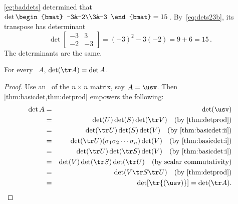 \begin{example} 
\cref{eg:baddets} determined that
\(\det\begin{bmat} -3&-2\\3&-3 \end{bmat}=15\)\,.
By~\eqref{eq:dets23b}, its transpose has determinant
\begin{equation*}
\det\begin{bmatrix} -3&3\\-2&-3 \end{bmatrix}
=(-3)^2-3(-2)=9+6=15\,.
\end{equation*}
The determinants are the same.
\end{example}




\begin{theorem} \label{thm:dettr} 
For every ~\(A\), \(\det(\tr A)=\det A\).
\end{theorem}
\begin{proof} 
Use an \svd\ of the \(n\times n\) matrix, say \(A=\usv\).
Then \cref{thm:basicdet,thm:detprod} empowers the following:
\begin{eqnarray*}
\det A&=&\det(\usv)
\\&=&\det(U)\det(S)\det(\tr V)\quad(\text{by \cref{thm:detprod}})
\\&=&\det(\tr U)\det(S)\det(V)\quad(\text{by \cref{thm:basicdet:ii}})
\\&=&\det(\tr U)(\sigma_1\sigma_2\cdots\sigma_n)\det(V)\quad(\text{by \cref{thm:basicdet:i}})
\\&=&\det(\tr U)\det(\tr S)\det(V)\quad(\text{by \cref{thm:basicdet:i}})
\\&=&\det(V)\det(\tr S)\det(\tr U)\quad(\text{by scalar commutativity})
\\&=&\det(V\tr S\tr U)\quad(\text{by \cref{thm:detprod}})
\\&=&\det[\tr{(\usv)}]=\det(\tr A).
\end{eqnarray*}
\end{proof}


